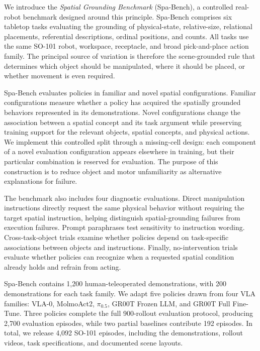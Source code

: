 \documentclass[conference]{IEEEtran}
\begin{document}
We introduce the \emph{Spatial Grounding Benchmark} (Spa-Bench), a controlled real-robot benchmark designed around this principle. Spa-Bench comprises six tabletop tasks evaluating the grounding of physical-state, relative-size, relational placements, referential descriptions, ordinal positions, and counts. All tasks use the same SO-101 robot, workspace, receptacle, and broad pick-and-place action family. The principal source of variation is therefore the scene-grounded rule that determines which object should be manipulated, where it should be placed, or whether movement is even required.

Spa-Bench evaluates policies in familiar and novel spatial configurations. Familiar configurations measure whether a policy has acquired the spatially grounded behaviors represented in its demonstrations. Novel configurations change the association between a spatial concept and its task argument while preserving training support for the relevant objects, spatial concepts, and physical actions. We implement this controlled split through a missing-cell design: each component of a novel evaluation configuration appears elsewhere in training, but their particular combination is reserved for evaluation. The purpose of this construction is to reduce object and motor unfamiliarity as alternative explanations for failure.

The benchmark also includes four diagnostic evaluations. Direct manipulation instructions directly request the same physical behavior without requiring the target spatial instruction, helping distinguish spatial-grounding failures from execution failures. Prompt paraphrases test sensitivity to instruction wording. Cross-task-object trials examine whether policies depend on task-specific associations between objects and instructions. Finally, no-intervention trials evaluate whether policies can recognize when a requested spatial condition already holds and refrain from acting.

Spa-Bench contains 1,200 human-teleoperated demonstrations, with 200 demonstrations for each task family. We adapt five policies drawn from four VLA families: VLA-0, MolmoAct2, $\pi_{0.5}$, GR00T Frozen LLM, and GR00T Full Fine-Tune. Three policies complete the full 900-rollout evaluation protocol, producing 2,700 evaluation episodes, while two partial baselines contribute 192 episodes. In total, we release 4,092 SO-101 episodes, including the demonstrations, rollout videos, task specifications, and documented scene layouts.
\end{document}
